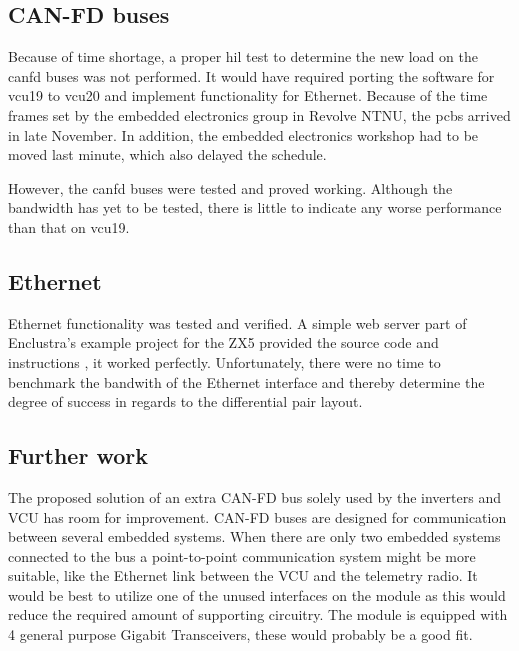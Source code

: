 \subsection{CAN-FD buses}

Because of time shortage, a proper \acrfull{hil} test to determine the new load on the \acrshort{canfd} buses was not performed. It would have required porting the software for \acrshort{vcu19} to \acrshort{vcu20} and implement functionality for Ethernet. Because of the time frames set by the embedded electronics group in Revolve NTNU, the \acrshort{pcb}s arrived in late November. In addition, the embedded electronics workshop had to be moved last minute, which also delayed the schedule.  

However, the \acrshort{canfd} buses were tested and proved working. Although the bandwidth has yet to be tested, there is little to indicate any worse performance than that on \acrshort{vcu19}.

\subsection{Ethernet}

Ethernet functionality was tested and verified. A simple web server part of Enclustra's example project for the ZX5 provided the source code and instructions \cite{zx5_ex}, it worked perfectly. Unfortunately, there were no time to benchmark the bandwith of the Ethernet interface and thereby determine the degree of success in regards to the differential pair layout. 

\subsection{Further work}

The proposed solution of an extra CAN-FD bus solely used by the inverters and VCU has room for improvement. CAN-FD buses are designed for communication between several embedded systems. When there are only two embedded systems connected to the bus a point-to-point communication system might be more suitable, like the Ethernet link between the VCU and the telemetry radio. It would be best to utilize one of the unused interfaces on the module as this would reduce the required amount of supporting circuitry. The module is equipped with 4 general purpose Gigabit Transceivers, these would probably be a good fit.

